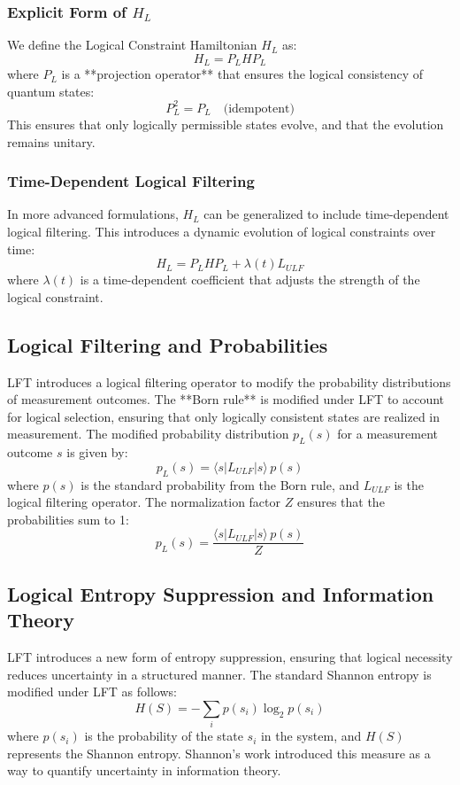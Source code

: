 \subsubsection{Explicit Form of $H_L$}
We define the Logical Constraint Hamiltonian $H_L$ as:
\[
H_L = P_L H P_L
\]
where $P_L$ is a **projection operator** that ensures the logical consistency of quantum states:
\[
P_L^2 = P_L \quad \text{(idempotent)}
\]
This ensures that only logically permissible states evolve, and that the evolution remains unitary.

\subsubsection{Time-Dependent Logical Filtering}
In more advanced formulations, $H_L$ can be generalized to include time-dependent logical filtering. This introduces a dynamic evolution of logical constraints over time:
\[
H_L = P_L H P_L + \lambda(t) L_{ULF}
\]
where $\lambda(t)$ is a time-dependent coefficient that adjusts the strength of the logical constraint.

\subsection{Logical Filtering and Probabilities}
LFT introduces a logical filtering operator to modify the probability distributions of measurement outcomes. The **Born rule** is modified under LFT to account for logical selection, ensuring that only logically consistent states are realized in measurement. The modified probability distribution $p_L(s)$ for a measurement outcome $s$ is given by:
\[
p_L(s) = \langle s | L_{ULF} | s \rangle \, p(s)
\]
where $p(s)$ is the standard probability from the Born rule, and $L_{ULF}$ is the logical filtering operator. The normalization factor $Z$ ensures that the probabilities sum to 1:
\[
p_L(s) = \frac{\langle s | L_{ULF} | s \rangle \, p(s)}{Z}
\]

\subsection{Logical Entropy Suppression and Information Theory}
LFT introduces a new form of entropy suppression, ensuring that logical necessity reduces uncertainty in a structured manner. The standard Shannon entropy \cite{shannon1948} is modified under LFT as follows:
\[
H(S) = - \sum_i p(s_i) \log_2 p(s_i)
\]
where \( p(s_i) \) is the probability of the state \( s_i \) in the system, and \( H(S) \) represents the Shannon entropy. Shannon's work \cite{shannon1948} introduced this measure as a way to quantify uncertainty in information theory.

